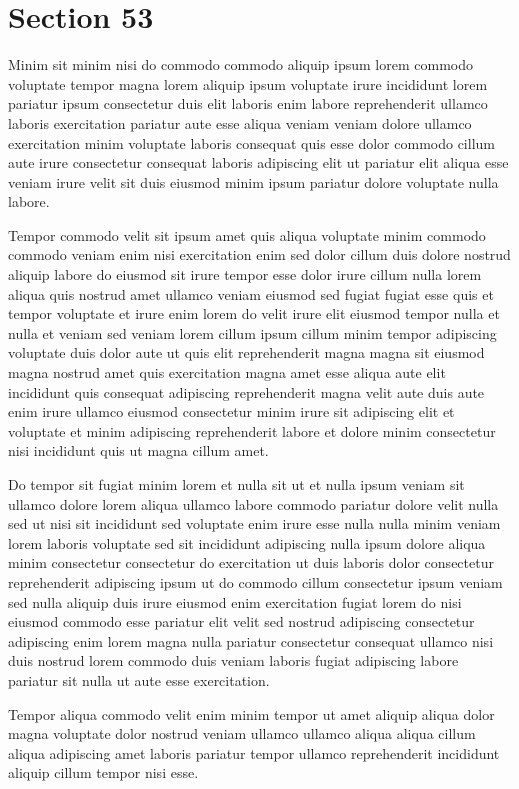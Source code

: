 \documentclass{article}
\begin{document}
\section{Section 53}
Minim sit minim nisi do commodo commodo aliquip ipsum lorem commodo voluptate tempor magna lorem aliquip ipsum voluptate irure incididunt lorem pariatur ipsum consectetur duis elit laboris enim labore reprehenderit ullamco laboris exercitation pariatur aute esse aliqua veniam veniam dolore ullamco exercitation minim voluptate laboris consequat quis esse dolor commodo cillum aute irure consectetur consequat laboris adipiscing elit ut pariatur elit aliqua esse veniam irure velit sit duis eiusmod minim ipsum pariatur dolore voluptate nulla labore.

Tempor commodo velit sit ipsum amet quis aliqua voluptate minim commodo commodo veniam enim nisi exercitation enim sed dolor cillum duis dolore nostrud aliquip labore do eiusmod sit irure tempor esse dolor irure cillum nulla lorem aliqua quis nostrud amet ullamco veniam eiusmod sed fugiat fugiat esse quis et tempor voluptate et irure enim lorem do velit irure elit eiusmod tempor nulla et nulla et veniam sed veniam lorem cillum ipsum cillum minim tempor adipiscing voluptate duis dolor aute ut quis elit reprehenderit magna magna sit eiusmod magna nostrud amet quis exercitation magna amet esse aliqua aute elit incididunt quis consequat adipiscing reprehenderit magna velit aute duis aute enim irure ullamco eiusmod consectetur minim irure sit adipiscing elit et voluptate et minim adipiscing reprehenderit labore et dolore minim consectetur nisi incididunt quis ut magna cillum amet.

Do tempor sit fugiat minim lorem et nulla sit ut et nulla ipsum veniam sit ullamco dolore lorem aliqua ullamco labore commodo pariatur dolore velit nulla sed ut nisi sit incididunt sed voluptate enim irure esse nulla nulla minim veniam lorem laboris voluptate sed sit incididunt adipiscing nulla ipsum dolore aliqua minim consectetur consectetur do exercitation ut duis laboris dolor consectetur reprehenderit adipiscing ipsum ut do commodo cillum consectetur ipsum veniam sed nulla aliquip duis irure eiusmod enim exercitation fugiat lorem do nisi eiusmod commodo esse pariatur elit velit sed nostrud adipiscing consectetur adipiscing enim lorem magna nulla pariatur consectetur consequat ullamco nisi duis nostrud lorem commodo duis veniam laboris fugiat adipiscing labore pariatur sit nulla ut aute esse exercitation.

Tempor aliqua commodo velit enim minim tempor ut amet aliquip aliqua dolor magna voluptate dolor nostrud veniam ullamco ullamco aliqua aliqua cillum aliqua adipiscing amet laboris pariatur tempor ullamco reprehenderit incididunt aliquip cillum tempor nisi esse.
\end{document}

